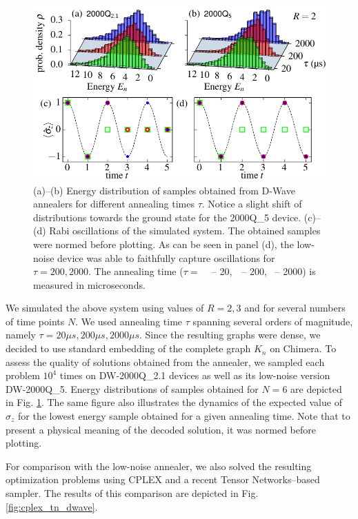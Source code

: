 \begin{figure}[!h]
    \centering
    \includegraphics{figures/fig2.pdf}
    \caption{(a)--(b) Energy distribution of samples obtained from D-Wave annealers for different annealing times $\tau$. Notice a slight shift of distributions towards the ground state for the 2000Q\_{5} device. (c)--(d) Rabi oscillations of the simulated system. The obtained samples were normed before plotting. As can be seen in panel (d), the low-noise device was able to faithfully capture oscillations for $\tau=200, 2000$.
    The annealing time ($\tau=$
    \tikzquad\,\,\, -- 20,
    \,\tikzcircle\,\,\,-- 200,
    \,\tikzdot\,\,-- 2000)
      is measured in microseconds.
    }
    \label{fig:energy-hist}
\end{figure}
We simulated the above system using values of $R=2, 3$ and for several numbers of time points $N$. We used annealing time $\tau$ spanning several orders of magnitude, namely $\tau=20\mu s, 200 \mu s, 2000 \mu s$. Since the resulting graphs were dense, we decided to use standard embedding of the complete graph $K_n$ on Chimera. To assess the quality of solutions obtained from the annealer, we sampled each problem $10^4$ times on  DW-2000Q\_{2.1} devices as well as its low-noise version DW-2000Q\_{5}. Energy distributions of samples obtained for $N=6$ are depicted in Fig. \ref{fig:energy-hist}. The same figure also illustrates the dynamics of the expected value of $\sigma_z$ for the lowest energy sample obtained for a given annealing time. Note that to present a physical meaning of the decoded solution, it was normed before plotting.

For comparison with the low-noise annealer, we also solved the resulting optimization problems using CPLEX and a recent Tensor Networks--based sampler. The results of this comparison are depicted in Fig. \ref{fig:cplex_tn_dwave}.

